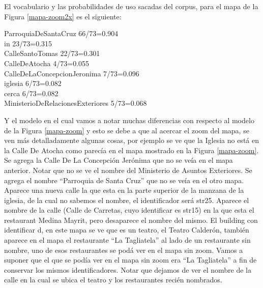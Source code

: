 El vocabulario y las probabilidades de uso sacadas del corpus, para el mapa de la Figura \ref{mapa-zoom2x} es el siguiente:

ParroquiaDeSantaCruz 66/73=0.904\\
in 23/73=0.315\\
CalleSantoTomas 22/73=0.301\\
CalleDeAtocha 4/73=0.055\\
CalleDeLaConcepcionJeronima 7/73=0.096\\
iglesia 6/73=0.082\\
cerca 6/73=0.082\\
MinisterioDeRelacionesExteriores 5/73=0.068 


Y el modelo en el cual vamos a notar muchas diferencias con respecto al modelo de la Figura \ref{mapa-zoom} y esto se debe a que al acercar el zoom del mapa, se ven m\'as detalladamente algunas cosas, por ejemplo se ve que la Iglesia no est\'a en la Calle De Atocha como parec\'ia en el mapa mostrado en la Figura \ref{mapa-zoom}. Se agrega la Calle De La Concepci\'on Jer\'onima que no se ve\'ia en el mapa anterior. Notar que no se ve el nombre del Ministerio de Asuntos Exteriores. Se agrega el nombre ``Parroquia de Santa Cruz'' que no se ve\'ia en el otro mapa. Aparece una nueva calle la que esta en la parte superior de la manzana de la iglesia, de la cual no sabemos el nombre, el identificador ser\'a str25. Aparece el nombre de la calle (Calle de Carretas, cuyo identificar es str15) en la que esta el restaurant Medina Mayrit, pero desaparece el nombre del mismo. El building con identificar d, en este mapa se ve que es un teatro, el Teatro Calderón, tambi\'en aparece en el mapa el restaurante ``La Tagliatela'' al lado de un restaurante sin nombre, uno de esos restaurantes se pod\'a ver en el mapa sin zoom. Vamos a suponer que el que se pod\'ia ver en el mapa sin zoom era ``La Tagliatela'' a fin de conservar los mismos identificadores. Notar que dejamos de ver el nombre de la calle en la cual se ubica el teatro y los restaurantes reci\'en nombrados.


